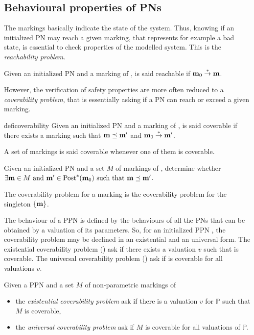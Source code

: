 \subsection{Behavioural properties of \acp{PN}}

The markings basically indicate the state of the system. Thus, knowing if an initialized \ac{PN} may reach a given marking, that represents for example a bad state, is essential to check properties of the modelled system. This is the \emph{reachability problem}.

\begin{defi}[Reachability]
  Given an initialized \ac{PN} \NPTm and a marking \mar of \PN, \mar is said reachable if $\mathbf{m}_0 \stackrel{*}{\to} \mathbf{m}$.
\end{defi}

However, the verification of safety properties are more often reduced to a \emph{coverability problem}, that is essentially asking if a \ac{PN} can reach or exceed a given marking.

\begin{restatable}[Coverability]{defi}{coverability}
  Given an initialized \ac{PN} \NPTm and a marking \mar of \PN, \mar is said coverable if there exists a marking \marp such that $\mathbf{m} \preceq \mathbf{m'}$ and $\mathbf{m}_0 \stackrel{*}{\to} \mathbf{m'}$.

  A set of markings is said coverable whenever one of them is coverable.
\end{restatable}

\begin{defi}
  Given an initialized \ac{PN} \NPTm and a set $M$ of markings of \PN, determine whether $\exists \mathbf{m} \in M \text{ and } \mathbf{m'} \in \operatorname{Post}^*(\mathbf{m}_0) \text{ such that } \mathbf{m} \preceq \mathbf{m'}$.

  The coverability problem for a marking \mar is the coverability problem for the singleton $\{\mathbf{m}\}$.
\end{defi}

The behaviour of a \ac{PPN} is defined by the behaviours of all the \acp{PN} that can be obtained by a valuation of its parameters.
So, for an initialized \ac{PPN} \PPN, the coverability problem may be declined in an existential and an universal form.
The existential coverability problem (\Ecov) ask if there exists a valuation $v$ such that \mar is coverable.
The universal coverability problem (\Ucov) ask if \mar is coverable for all valuations $v$.

\begin{defi}
  Given a \ac{PPN} \SPTPm and a set $M$ of non-parametric markings of \PPN
  \begin{itemize}
    \item the \emph{existential coverability problem} ask if there is a valuation $v$ for $\mathbb{P}$ such that $M$ is coverable,
    \item the \emph{universal   coverability problem} ask if $M$ is coverable for all valuations of $\mathbb{P}$.
  \end{itemize}
\end{defi}


